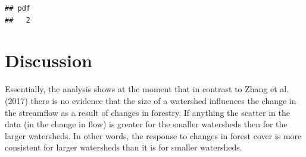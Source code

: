 \documentclass[]{elsarticle} %
\newenvironment{Shaded}{\begin{snugshade}}{\end{snugshade}}
\newcommand{\DataTypeTok}[1]{\textcolor[rgb]{0.13,0.29,0.53}{#1}}
\newcommand{\DecValTok}[1]{\textcolor[rgb]{0.00,0.00,0.81}{#1}}
\newcommand{\FloatTok}[1]{\textcolor[rgb]{0.00,0.00,0.81}{#1}}
\newcommand{\KeywordTok}[1]{\textcolor[rgb]{0.13,0.29,0.53}{\textbf{#1}}}
\newcommand{\NormalTok}[1]{#1}
\newcommand{\OperatorTok}[1]{\textcolor[rgb]{0.81,0.36,0.00}{\textbf{#1}}}
\newcommand{\StringTok}[1]{\textcolor[rgb]{0.31,0.60,0.02}{#1}}
\begin{document}
\begin{verbatim}
## pdf 
##   2
\end{verbatim}

\begin{Shaded}
\end{Shaded}

\begin{Shaded}
\end{Shaded}

\begin{Shaded}
\end{Shaded}

\hypertarget{discussion}{%
\section{Discussion}\label{discussion}}

Essentially, the analysis shows at the moment that in contrast to Zhang
et al. (2017) there is no evidence that the size of a watershed
influences the change in the streamflow as a result of changes in
forestry. If anything the scatter in the data (in the change in flow) is
greater for the smaller watersheds then for the larger watersheds. In
other words, the response to changes in forest cover is more consistent
for larger watersheds than it is for smaller watersheds.
\end{document}
